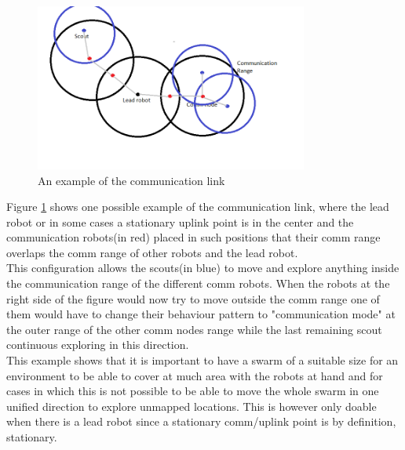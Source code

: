 \begin{figure}[h]
\centering
\includegraphics[width = 0.8\textwidth]{../../figures/comm_example.png} 
\caption{An example of the communication link}
\label{comm_link_example}
\end{figure}

Figure \ref{comm_link_example} shows one possible example of the communication link, where the lead robot or in some cases a stationary uplink point is in the center and the communication robots(in red) placed in such positions that their comm range overlaps the comm range of other robots and the lead robot. \\
This configuration allows the scouts(in blue) to move and explore anything inside the communication range of the different comm robots. When the robots at the right side of the figure would now try to move outside the comm range one of them would have to change their behaviour pattern to "communication mode" at the outer range of the other comm nodes range while the last remaining scout continuous exploring in this direction. \\
This example shows that it is important to have a swarm of a suitable size for an environment to be able to cover at much area with the robots at hand and for cases in which this is not possible to be able to move the whole swarm in one unified direction to explore unmapped locations. This is however only doable when there is a lead robot since a stationary comm/uplink point is by definition, stationary.\\


